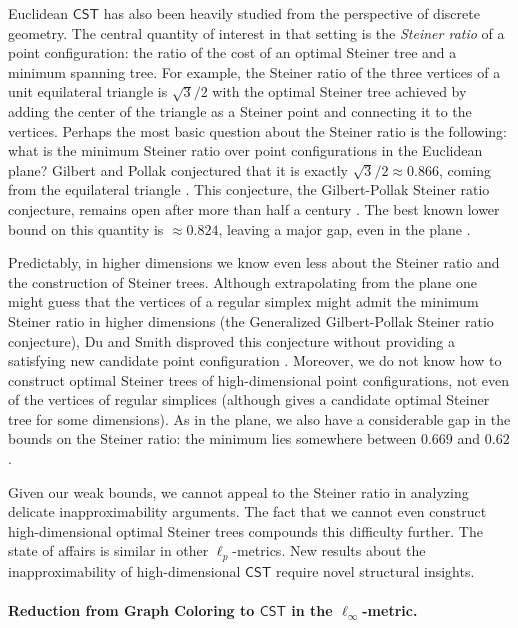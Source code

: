\documentclass{article}\providecommand{\DeclareRedundantLanguages}[2]{}\usepackage[a4paper,margin=20mm]{geometry}
\newcommand{\1}{\textbf{1}}
\newcommand{\cst}{$\mathsf{CST}$\xspace}
\begin{document}
Euclidean \cst has also been heavily studied from the perspective of discrete geometry. The central quantity of interest in that setting is the \textit{Steiner ratio} of a point configuration: the ratio of the cost of an optimal Steiner tree and a minimum spanning tree. For example, the Steiner ratio of the three vertices of a unit equilateral triangle is $\sqrt{3}/2$ with the optimal Steiner tree achieved by adding the center of the triangle as a Steiner point and connecting it to the vertices. Perhaps the most basic question about the Steiner ratio is the following: what is the minimum Steiner ratio over point configurations in the Euclidean plane? Gilbert and Pollak conjectured that it is exactly $\sqrt{3}/2 \approx 0.866$, coming from the equilateral triangle \cite{Gilbert_Pollak_1968}. This conjecture, the Gilbert-Pollak Steiner ratio conjecture, remains open after more than half a century \cite{ivanov2012steiner}. The best known lower bound on this quantity is $\approx 0.824$, leaving a major gap, even in the plane \cite{Chung_Graham_1985}. 

Predictably, in higher dimensions we know even less about the Steiner ratio and the construction of Steiner trees. Although extrapolating from the plane one might guess that the vertices of a regular simplex might admit the minimum Steiner ratio in higher dimensions (the Generalized Gilbert-Pollak Steiner ratio conjecture), Du and Smith disproved this conjecture without providing a satisfying new candidate point configuration \cite{Du_Smith_1996}. Moreover, we do not know how to construct optimal Steiner trees of high-dimensional point configurations, not even of the vertices of regular simplices (although \cite{Chung_Gilbert_1976} gives a candidate optimal Steiner tree for some dimensions). As in the plane, we also have a considerable gap in the bounds on the Steiner ratio: the minimum lies somewhere between $0.669$ and $0.62$ \cite{Chung_Gilbert_1976, Du_Smith_1996, Du_Wu_Lu_Xu_2011}. 

Given our weak bounds, we cannot appeal to the Steiner ratio in analyzing delicate inapproximability arguments. The fact that we cannot even construct high-dimensional optimal Steiner trees compounds this difficulty further. The state of affairs is similar in other $\ell_p$-metrics. New results about the inapproximability of high-dimensional \cst require novel structural insights.



\paragraph{\texorpdfstring{Reduction from Graph Coloring to \cst in the $\ell_{\infty}$-metric.}{Reduction from Graph Coloring to CST in the l_inf-metric.}}
\end{document}
